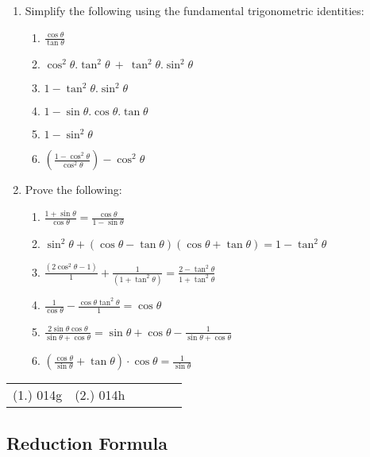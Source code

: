 {
\begin{enumerate}
	\item Simplify the following using the fundamental trigonometric identities:
	\begin{enumerate}
		\item $\frac{\cos\theta }{\tan\theta }$
		\item $\cos^2\theta.\tan^2\theta\ +\ \tan^2\theta.\sin^2\theta$
		\item $1 - \tan^2\theta.\sin^2\theta$
		\item $1 - \sin\theta.\cos\theta.\tan\theta $
		\item $1-\sin^2\theta $
		\item $\left(\frac{1 - \cos^2\theta }{\cos^2\theta }\right) - \cos^2\theta$
	\end{enumerate}
	\item Prove the following:
	\begin{enumerate}
		\item $\frac{1 + \sin\theta}{\cos\theta} = \frac{\cos\theta}{1 - \sin\theta}$
		\item $\sin^2\theta + (\cos\theta - \tan\theta)(\cos\theta + \tan\theta)  = 1 - \tan^2\theta$
		\item $\frac{(2\cos^2\theta - 1)}{1} + \frac{1}{(1 + \tan^2\theta)} = \frac{2 - \tan^2\theta}{1 + \tan^2\theta}$
		\item $\frac{1}{\cos\theta} - \frac{\cos\theta\tan^2\theta}{1} = \cos\theta$
		\item $\frac{2\sin\theta\cos\theta}{\sin\theta+\cos\theta} = \sin\theta+\cos\theta - \frac{1}{\sin\theta+\cos\theta}$
		\item $\left(\frac{\cos\theta}{\sin\theta} + \tan\theta \right)\cdot\cos\theta = \frac{1}{\sin\theta}$
	\end{enumerate}
\end{enumerate}


\par \practiceinfo
\par \begin{tabular}[h]{cccccc}
(1.)	014g	&
(2.)	014h	&
\end{tabular}}


\subsection{Reduction Formula}

